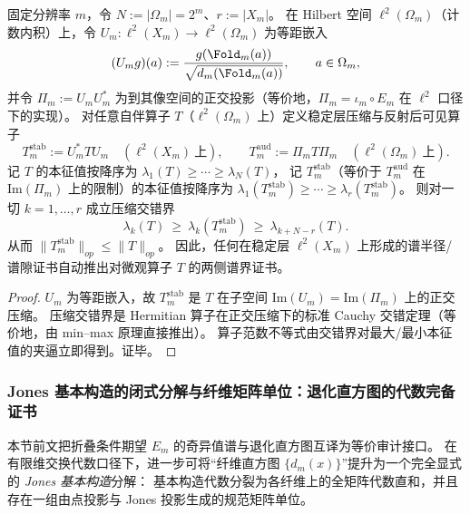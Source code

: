 \begin{proposition}\label{prop:fold-audit-spectral-interlacing}
固定分辨率 \(m\)，令 \(N:=|\Omega_m|=2^m\)、\(r:=|X_m|\)。
在 Hilbert 空间 \(\ell^2(\Omega_m)\)（计数内积）上，令 \(U_m:\ell^2(X_m)\to \ell^2(\Omega_m)\) 为等距嵌入
\[
(U_m g)(a):=\frac{g(\Fold_m(a))}{\sqrt{d_m(\Fold_m(a))}},\qquad a\in\Omega_m,
\]
并令 \(\Pi_m:=U_mU_m^\ast\) 为到其像空间的正交投影（等价地，\(\Pi_m=\iota_m\circ E_m\) 在 \(\ell^2\) 口径下的实现）。
对任意自伴算子 \(T\)（\(\ell^2(\Omega_m)\) 上）定义稳定层压缩与反射后可见算子
\[
T_m^{\mathrm{stab}}:=U_m^\ast T U_m\quad(\ell^2(X_m)\ \text{上}),
\qquad
T_m^{\mathrm{aud}}:=\Pi_m T \Pi_m\quad(\ell^2(\Omega_m)\ \text{上}).
\]
记 \(T\) 的本征值按降序为 \(\lambda_1(T)\ge\cdots\ge\lambda_N(T)\)，
记 \(T_m^{\mathrm{stab}}\)（等价于 \(T_m^{\mathrm{aud}}\) 在 \(\mathrm{Im}(\Pi_m)\) 上的限制）的本征值按降序为
\(\lambda_1(T_m^{\mathrm{stab}})\ge\cdots\ge\lambda_r(T_m^{\mathrm{stab}})\)。
则对一切 \(k=1,\dots,r\) 成立压缩交错界
\[
\boxed{\;
\lambda_k(T)\ \ge\ \lambda_k(T_m^{\mathrm{stab}})\ \ge\ \lambda_{k+N-r}(T).
\;}
\]
从而 \(\|T_m^{\mathrm{stab}}\|_{op}\le \|T\|_{op}\)。
因此，任何在稳定层 \(\ell^2(X_m)\) 上形成的谱半径/谱隙证书自动推出对微观算子 \(T\) 的两侧谱界证书。
\end{proposition}
\begin{proof}
\(U_m\) 为等距嵌入，故 \(T_m^{\mathrm{stab}}\) 是 \(T\) 在子空间 \(\mathrm{Im}(U_m)=\mathrm{Im}(\Pi_m)\) 上的正交压缩。
压缩交错界是 Hermitian 算子在正交压缩下的标准 Cauchy 交错定理（等价地，由 min--max 原理直接推出）。
算子范数不等式由交错界对最大/最小本征值的夹逼立即得到。证毕。
\end{proof}

\subsubsection{Jones 基本构造的闭式分解与纤维矩阵单位：退化直方图的代数完备证书}\label{subsubsec:op-algebra-fold-jones-basic-construction}
本节前文把折叠条件期望 \(E_m\) 的奇异值谱与退化直方图互译为等价审计接口。
在有限维交换代数口径下，进一步可将“纤维直方图 \(\{d_m(x)\}\)”提升为一个完全显式的 \emph{Jones 基本构造}分解：
基本构造代数分裂为各纤维上的全矩阵代数直和，并且存在一组由点投影与 Jones 投影生成的规范矩阵单位。


